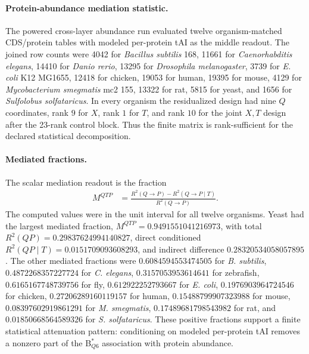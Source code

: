 \paragraph{Protein-abundance mediation statistic.}
The powered cross-layer abundance run evaluated twelve organism-matched CDS/protein tables with modeled per-protein tAI as the middle readout.  The joined row counts were 4042 for \emph{Bacillus subtilis} 168, 11661 for \emph{Caenorhabditis elegans}, 14410 for \emph{Danio rerio}, 13295 for \emph{Drosophila melanogaster}, 3739 for \emph{E. coli} K12 MG1655, 12418 for chicken, 19053 for human, 19395 for mouse, 4129 for \emph{Mycobacterium smegmatis} mc2 155, 13322 for rat, 5815 for yeast, and 1656 for \emph{Sulfolobus solfataricus}.  In every organism the residualized design had nine $Q$ coordinates, rank $9$ for $X$, rank $1$ for $T$, and rank $10$ for the joint $X,T$ design after the 23-rank control block.  Thus the finite matrix is rank-sufficient for the declared statistical decomposition.

\paragraph{Mediated fractions.}
The scalar mediation readout is the fraction
$$
\begin{aligned}
M^{QTP} &= \frac{R^2(Q \to P)-R^2(Q \to P\mid T)}{R^2(Q \to P)} .
\end{aligned}
$$
The computed values were in the unit interval for all twelve organisms.  Yeast had the largest mediated fraction, $M^{QTP}=0.9491551041216973$, with total $R^2(QP)=0.29837624994140827$, direct conditioned $R^2(QP\mid T)=0.0151709093608293$, and indirect difference $0.28320534058057895$.  The other mediated fractions were $0.6084594553474505$ for \emph{B. subtilis}, $0.4872268357227724$ for \emph{C. elegans}, $0.3157053953614641$ for zebrafish, $0.6165167748739756$ for fly, $0.612922252793667$ for \emph{E. coli}, $0.1976903964724546$ for chicken, $0.27206289160119157$ for human, $0.15488799907323988$ for mouse, $0.08397602919861291$ for \emph{M. smegmatis}, $0.17489681798543982$ for rat, and $0.01850668564589326$ for \emph{S. solfataricus}.  These positive fractions support a finite statistical attenuation pattern: conditioning on modeled per-protein tAI removes a nonzero part of the B$^{\ast}_{Q6}$ association with protein abundance.

